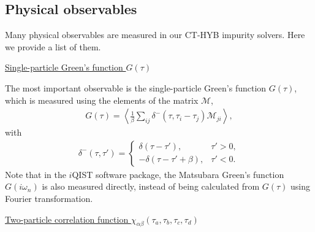 \subsection{Physical observables}

Many physical observables are measured in our CT-HYB impurity solvers. Here we provide a list of them.

\underline{Single-particle Green's function $G(\tau)$}

The most important observable is the single-particle Green's function $G(\tau)$, which is measured using the elements of the matrix $\mathcal{M}$, 
\begin{align}
\label{eq:gt}
G(\tau) = \left\langle \frac{1}{\beta} \sum_{ij}\delta^{-}(\tau, \tau_i - \tau_j) \mathcal{M}_{ji}\right\rangle,
\end{align}
with 
\begin{align}
\delta^{-}(\tau, \tau') = 
\begin{cases} 
\delta(\tau - \tau'), & \tau' > 0, \\
-\delta(\tau - \tau' + \beta), & \tau' < 0.
\end{cases}
\end{align}
Note that in the $i$QIST software package, the Matsubara Green's function $G(i\omega_n)$ is also measured directly, instead of being calculated from $G(\tau)$ using Fourier transformation.

\underline{Two-particle correlation function $\chi_{\alpha\beta}(\tau_a,\tau_b,\tau_c,\tau_d)$}

